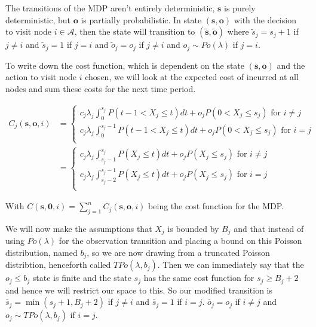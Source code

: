 \documentclass[a4paper,10pt]{article}
\theoremstyle{definition}
\theoremstyle{definition}
\theoremstyle{remark}
\theoremstyle{definition}
\begin{document}
The transitions of the MDP aren't entirely deterministic, $\bm{s}$ is purely deterministic, but $\bm{o}$ is partially probabilistic. In state $(\bm{s},\bm{o})$ with the decision to visit node $i \in \mathcal{A}$, then the state will transition to $(\widetilde{\bm{s}},\widetilde{\bm{o}})$ where $\widetilde{s}_{j}=s_{j}+1$ if $j \neq i$ and $\widetilde{s}_{j}=1$ if $j=i$ and $\widetilde{o}_{j}=o_{j}$ if $j \neq i$ and $o_{j} \sim Po(\lambda)$ if $j=i$.

To write down the cost function, which is dependent on the state $(\bm{s},\bm{o})$ and the action to visit node $i$ chosen, we will look at the expected cost of incurred at all nodes and sum these costs for the next time period.

\begin{align}
C_{j}(\bm{s},\bm{o},i)&= \begin{cases}
c_{j} \lambda_{j} \int_{0}^{s_{j}} P(t-1<X_{j} \leq t) dt +o_{j}P(0<X_{j} \leq s_{j})  \text{ for } i \neq j \\
c_{j} \lambda_{j} \int_{0}^{s_{j}-1} P(t-1<X_{j} \leq t) dt +o_{j}P(0<X_{j} \leq s_{j})  \text{ for } i=j \\
\end{cases}
 \nonumber \\
&= \begin{cases}
c_{j} \lambda_{j} \int_{s_{j}-1}^{s_{j}} P(X_{j} \leq t) dt +o_{j}P(X_{j} \leq s_{j}) \text{ for } i \neq j \\
c_{j} \lambda_{j} \int_{s_{j}-2}^{s_{j}-1} P(X_{j} \leq t) dt +o_{j}P(X_{j} \leq s_{j})   \text{ for } i=j \\
\end{cases} 
\end{align}
   
With $C(\bm{s},\bm{0},i)=\sum\limits_{j=1}^{n} C_{j}(\bm{s},\bm{o},i)$ being the cost function for the MDP.

We will now make the assumptions that $X_{j}$ is bounded by $B_{j}$ and that instead of using $Po(\lambda)$ for the observation transition and placing a bound on this Poisson distribution, named $b_{j}$, so we are now drawing from a truncated Poisson distribtion, henceforth called $TPo(\lambda,b_{j})$. Then we can immediately say that the $o_{j} \leq b_{j}$ state is finite and the state $s_{j}$ has the same cost function for $s_{j} \geq B_{j}+2$ and hence we will restrict our space to this. So our modified transition is $\widetilde{s_{j}}=\min(s_{j}+1,B_{j}+2)$ if $j \neq i$ and $\widetilde{s_{j}}=1$ if $i=j$. $\widetilde{o_{j}}=o_{j}$ if $i \neq j$ and $o_{j} \sim TPo(\lambda,b_{j})$ if $i=j$.
\end{document}
